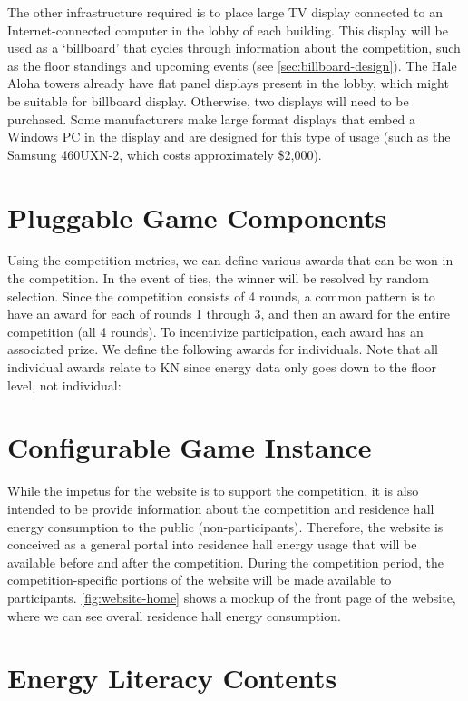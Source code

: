 The other infrastructure required is to place large TV display connected to an Internet-connected computer in the lobby of each building. This display will be used as a `billboard' that cycles through information about the competition, such as the floor standings and upcoming events (see \autoref{sec:billboard-design}). The Hale Aloha towers already have flat panel displays present in the lobby, which might be suitable for billboard display. Otherwise, two displays will need to be purchased. Some manufacturers make large format displays that embed a Windows PC in the display and are designed for this type of usage (such as the Samsung 460UXN-2, which costs approximately \$2,000).

\section{Pluggable Game Components}

Using the competition metrics, we can define various awards that can be won in the competition. In the event of ties, the winner will be resolved by random selection. Since the competition consists of 4 rounds, a common pattern is to have an award for each of rounds 1 through 3, and then an award for the entire competition (all 4 rounds). To incentivize participation, each award has an associated prize. We define the following awards for individuals. Note that all individual awards relate to KN since energy data only goes down to the floor level, not individual:

\section{Configurable Game Instance}


While the impetus for the website is to support the competition, it is also intended to be provide information about the competition and residence hall energy consumption to the public (non-participants). Therefore, the website is conceived as a general portal into residence hall energy usage that will be available before and after the competition. During the competition period, the competition-specific portions of the website will be made available to participants. \autoref{fig:website-home} shows a mockup of the front page of the website, where we can see overall residence hall energy consumption.

\section{Energy Literacy Contents}

